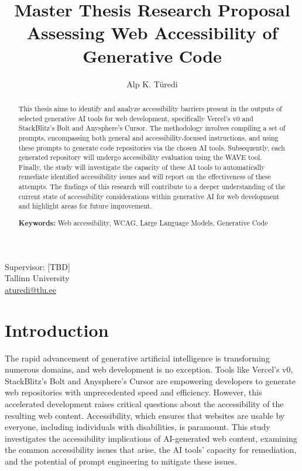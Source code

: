 \documentclass{article}
\title{%
  \textbf{Master Thesis Research Proposal}\\
  \vfill
  \textbf{Assessing Web Accessibility of Generative Code}
}
\author{Alp K. Türedi}
\begin{document}
\maketitle

{\centering
  Supervisor: [TBD]\\
  \vfill
  Tallinn University\\
  \href{mailto:aturedi@tlu.ee}{aturedi@tlu.ee}\\
}

\begin{abstract}
  This thesis aims to identify and analyze accessibility barriers present in the outputs of selected generative AI tools for web development,
  specifically Vercel's v0 and StackBlitz's Bolt and Anysphere's Cursor.
  The methodology involves compiling a set of prompts, encompassing both general and accessibility-focused instructions,
  and using these prompts to generate code repositories via the chosen AI tools.
  Subsequently, each generated repository will undergo accessibility evaluation using the WAVE tool.
  Finally, the study will investigate the capacity of these AI tools to automatically remediate identified accessibility issues
  and will report on the effectiveness of these attempts.
  The findings of this research will contribute to a deeper understanding of the current state of accessibility considerations within generative AI
  for web development and highlight areas for future improvement.

  \vfill
  \textbf{Keywords:} Web accessibility, WCAG, Large Language Models, Generative Code
\end{abstract}


\section{Introduction}
The rapid advancement of generative artificial intelligence is transforming numerous domains, and web development is no exception.
Tools like Vercel's v0, StackBlitz's Bolt and Anysphere's Cursor are empowering developers to generate web repositories with unprecedented speed and efficiency.
However, this accelerated development raises critical questions about the accessibility of the resulting web content.
Accessibility, which ensures that websites are usable by everyone, including individuals with disabilities, is paramount.
This study investigates the accessibility implications of AI-generated web content, examining the common accessibility issues that arise,
the AI tools' capacity for remediation, and the potential of prompt engineering to mitigate these issues.
\end{document}
